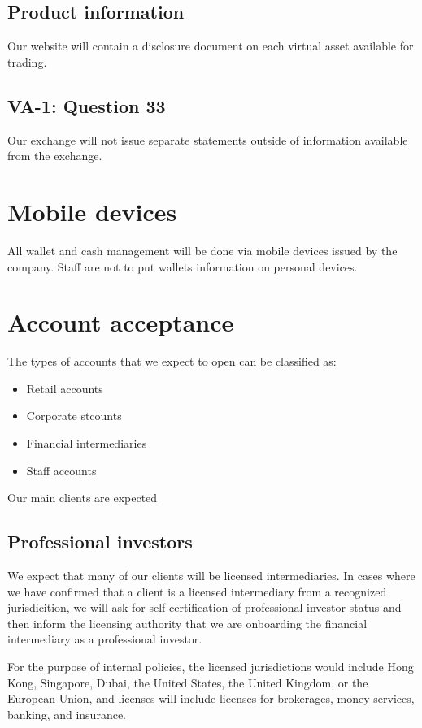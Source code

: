 \subsection{Product information}
Our website will contain a disclosure document on each virtual asset
available for trading.

\subsection{VA-1: Question 33}
Our exchange will not issue separate statements outside of information
available from the exchange.

\section{Mobile devices}
All wallet and cash management will be done via mobile devices issued
by the company.  Staff are not to put wallets information on personal
devices.

\section{Account acceptance}

The types of accounts that we expect to open can be classified as:

\begin{itemize}
\item Retail accounts
  \item Corporate stcounts
\item Financial intermediaries
\item Staff accounts
  \end{itemize}

Our main clients are expected

\subsection{Professional investors}
We expect that many of our clients will be licensed intermediaries.
In cases where we have confirmed that a client is a licensed
intermediary from a recognized jurisdicition, we will ask for
self-certification of professional investor status and then inform the
licensing authority that we are onboarding the financial intermediary
as a professional investor.

For the purpose of internal policies, the licensed jurisdictions would
include Hong Kong, Singapore, Dubai, the United States, the United
Kingdom, or the European Union, and licenses will include licenses for
brokerages, money services, banking, and insurance.

